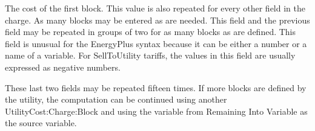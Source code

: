 The cost of the first block. This value is also repeated for every other field in the charge. As many blocks may be entered as are needed. This field and the previous field may be repeated in groups of two for as many blocks as are defined. This field is unusual for the EnergyPlus syntax because it can be either a number or a name of a variable. For SellToUtility tariffs, the values in this field are usually expressed as negative numbers.

These last two fields may be repeated fifteen times. If more blocks are defined by the utility, the computation can be continued using another UtilityCost:Charge:Block and using the variable from Remaining Into Variable as the source variable.
